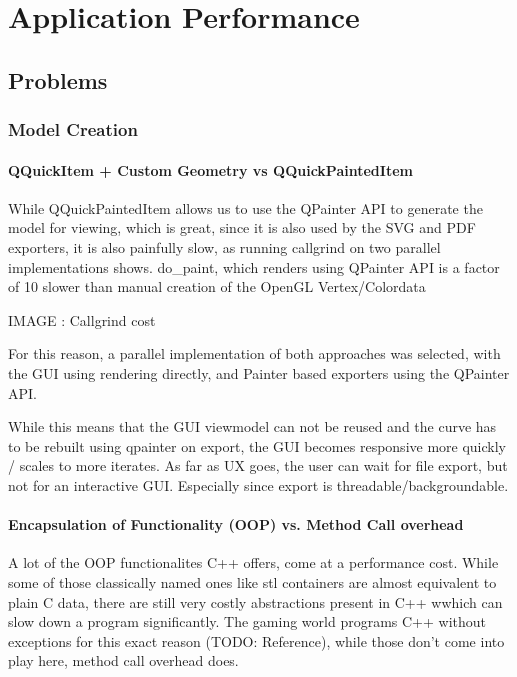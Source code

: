 \chapter{Application Performance}

\section{Problems}
\subsection{Model Creation}

\subsubsection{QQuickItem + Custom Geometry vs QQuickPaintedItem}
While QQuickPaintedItem allows us to use the QPainter API to generate the model for viewing, which is great, since it is also used by the SVG and PDF exporters, it is also painfully slow, as running callgrind on two parallel implementations shows.
do\_paint, which renders using QPainter API is a factor of 10 slower than manual creation of the OpenGL Vertex/Colordata

IMAGE : Callgrind cost

For this reason, a parallel implementation of both approaches was selected, with the GUI using rendering directly, and Painter based exporters using the QPainter API.

While this means that the GUI viewmodel can not be reused and the curve has to be rebuilt using qpainter on export, the GUI becomes responsive more quickly / scales to more iterates. As far as UX goes, the user can wait for file export, but not for an interactive GUI.
Especially since export is threadable/backgroundable.

\subsubsection{Encapsulation of Functionality (OOP) vs. Method Call overhead}
A lot of the OOP functionalites C++ offers, come at a performance cost.
While some of those classically named ones like stl containers are almost equivalent to plain C data, there are still very costly abstractions present in C++ wwhich can slow down a program significantly.
The gaming world programs C++ without exceptions for this exact reason (TODO: Reference), while those don't come into play here, method call overhead does.


